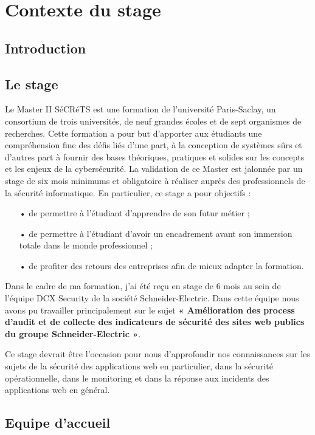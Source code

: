 \documentclass[a4paper,12pt]{book}
\theoremstyle{break}
\begin{document}
\chapter{Contexte du stage}
\section*{Introduction}
\section{Le stage}
Le Master II SéCRéTS est une formation de l’université Paris-Saclay, un consortium de trois universités, de neuf grandes écoles et de sept organismes de recherches. \newline
Cette formation a pour but d’apporter aux étudiants une compréhension fine des défis liés d’une part, à la conception de systèmes sûrs et d’autres part à fournir des bases théoriques, pratiques et solides sur les concepts et les enjeux de la cybersécurité. \newline
La validation de ce Master est jalonnée par un stage de six mois minimums et obligatoire à réaliser auprès des professionnels de la sécurité informatique. 
En particulier, ce stage a pour objectifs : 
\begin{itemize}
    \item[•]	de permettre à l’étudiant d’apprendre de son futur métier ;
    \item [•]	de permettre à l’étudiant d’avoir un encadrement avant son immersion totale dans le monde professionnel ;
    \item [•]	de profiter des retours des entreprises afin de mieux adapter la formation. 
\end{itemize}


Dans le cadre de ma formation, j’ai été reçu en stage de 6 mois au sein de l’équipe DCX Security de la société Schneider-Electric. Dans cette équipe nous avons pu travailler principalement sur le sujet \textbf{« Amélioration des process d'audit et de collecte des indicateurs de sécurité des sites web publics du groupe Schneider-Electric »}. 

Ce stage devrait être l’occasion pour nous d’approfondir nos connaissances sur les sujets de la sécurité des applications web en particulier, dans la sécurité opérationnelle, dans le monitoring et dans la réponse aux incidents des applications web en général. 

\section{Equipe d’accueil}
\end{document}
